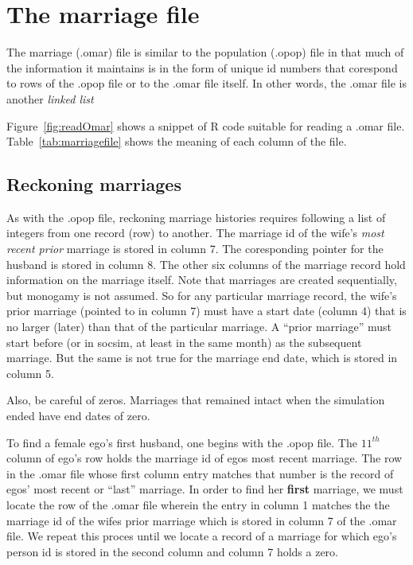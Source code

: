 
\section{The marriage file}
\label{sec:marriageFile}
The marriage (.omar) file is similar to the population (.opop) file in
that much of the information it maintains is in the form of unique id
numbers that corespond to rows of the .opop file or to the .omar file
itself.  In other words, the .omar file is another  \emph{linked list}

Figure~\ref{fig:readOmar} shows a snippet of R code suitable for
reading a .omar file.  Table~\ref{tab:marriagefile} shows the meaning
of each column of the file.

\subsection{Reckoning marriages}


As with the .opop file, reckoning marriage histories requires
following a list of integers from one record (row) to another. The
marriage id of the wife's \emph{most recent prior} marriage is stored
in column 7.  The coresponding pointer for the husband is stored in
column 8.  The other six columns of the marriage record hold
information on the marriage itself.  Note that marriages are created
sequentially, but monogamy is not assumed. So for any particular
marriage record, the wife's prior marriage (pointed to in column 7)
must have a start date (column 4) that is no larger (later) than that
of the particular marriage.  A ``prior marriage'' must start before
(or in socsim, at least in the same month) as the subsequent
marriage.  But the same is not true for the marriage end date, which
is stored in column 5.  

Also, be careful of zeros.  Marriages that remained intact when the
simulation ended have end dates of zero.  

To find a female ego's first husband, one begins with the .opop file.
The $11^{th}$ column of ego's row holds the marriage id of egos most
recent marriage. The row in the .omar file whose first column entry
matches that number is the record of egos' most recent or ``last''
marriage.  In order to find her \textbf{first} marriage, we must
locate the row of the .omar file wherein the entry in column 1 matches
the the marriage id of the  wifes prior marriage which is stored in
column 7 of the .omar file.  We repeat this proces until we locate a
record of a marriage for which ego's person id is stored in the second
column and column 7 holds a zero.

